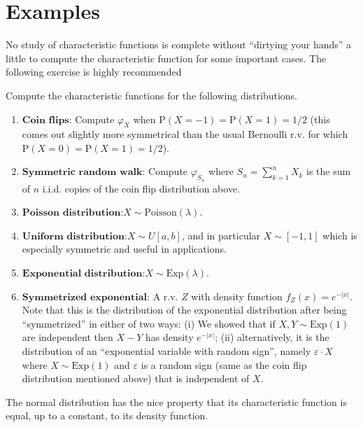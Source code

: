 \section{Examples}

No study of characteristic functions is complete
without ``dirtying your hands'' a little to compute
the characteristic function for some important cases.
The following exercise is highly recommended

\begin{xexercise}
Compute the characteristic functions for the
following distributions.

\begin{enumerate}[label=\arabic*.]
\item $\textbf{Coin flips:}$ Compute $\varphi_X$ when
$\mathrm{P}(X=-1)=\mathrm{P}(X=1)=1/2$ (this comes
out slightly more symmetrical than the usual Bernoulli
r.v. for which $\mathrm{P}(X=0)=\mathrm{P}(X=1)=1/2$).

\item $\textbf{Symmetric random walk:}$ Compute
$\varphi_{S_n}$ where $S_n=\sum_{k=1}^n X_k$ is the
sum of $n$ i.i.d. copies of the coin flip
distribution above.

\item $\textbf{Poisson distribution:}$$X\sim \textrm{Poisson}(\lambda)$.

\item $\textbf{Uniform distribution:}$$X \sim U[a,b]$, and
in particular $X\sim [-1,1]$ which is especially
symmetric and useful in applications.

\item $\textbf{Exponential distribution:}$$X\sim \textrm{Exp}(\lambda)$.

\item $\textbf{Symmetrized exponential:}$ A r.v. $Z$ with
density function $f_Z(x) = e^{-|x|}$. Note that this
is the distribution of the exponential distribution
after being ``symmetrized'' in either of two ways: (i)
We showed that if $X,Y\sim \textrm{Exp}(1)$ are
independent then $X-Y$ has density $e^{-|x|}$; (ii)
alternatively, it is the distribution of an
``exponential variable with random sign'', namely
$\varepsilon\cdot X$ where $X\sim \textrm{Exp}(1)$
and $\varepsilon$ is a random sign (same as the coin
flip distribution mentioned above) that is independent
of $X$.
\end{enumerate}

\end{xexercise}

\noindent The normal distribution has the nice property that
its characteristic function is equal, up to a
constant, to its density function.


